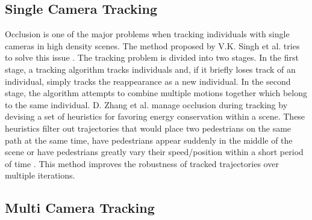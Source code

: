 \documentclass[12pt, twocolumn, conference]{IEEEtran}
\begin{document}
\subsection{Single Camera Tracking}

Occlusion is one of the major problems when tracking individuals with single cameras in high density scenes. The method proposed by V.K. Singh et al. tries to solve this issue \cite{V.K. Singh}. The tracking problem is divided into two stages. In the first stage, a tracking algorithm tracks individuals and, if it briefly loses track of an individual, simply tracks the reappearance as a new individual. In the second stage, the algorithm attempts to combine multiple motions together which belong to the same individual.
D. Zhang et al. manage occlusion during tracking by devising a set of heuristics for favoring energy conservation within a scene. These heuristics filter out trajectories that would place two pedestrians on the same path at the same time, have pedestrians appear suddenly in the middle of the scene or have pedestrians greatly vary their speed/position within a short period of time \cite{D. Zhang}. This method improves the robustness of tracked trajectories over multiple iterations.

\subsection{Multi Camera Tracking}
\end{document}
